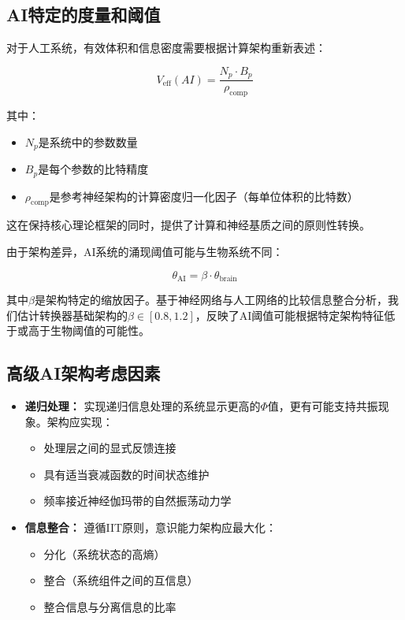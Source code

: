 \documentclass[12pt]{article}
\begin{document}
\begin{CJK}{UTF8}{gbsn}
\subsection{AI特定的度量和阈值}

对于人工系统，有效体积和信息密度需要根据计算架构重新表述：

\begin{equation}
V_{\text{eff}}(AI) = \frac{N_p \cdot B_p}{\rho_{\text{comp}}}
\end{equation}

其中：
\begin{itemize}
    \item $N_p$是系统中的参数数量
    \item $B_p$是每个参数的比特精度
    \item $\rho_{\text{comp}}$是参考神经架构的计算密度归一化因子（每单位体积的比特数）
\end{itemize}

这在保持核心理论框架的同时，提供了计算和神经基质之间的原则性转换。

由于架构差异，AI系统的涌现阈值可能与生物系统不同：

\begin{equation}
\theta_{\text{AI}} = \beta \cdot \theta_{\text{brain}}
\end{equation}

其中$\beta$是架构特定的缩放因子。基于神经网络与人工网络的比较信息整合分析\cite{tononi2016,oizumi2014}，我们估计转换器基础架构的$\beta \in [0.8, 1.2]$，反映了AI阈值可能根据特定架构特征低于或高于生物阈值的可能性。

\subsection{高级AI架构考虑因素}
\begin{itemize}
    \item \textbf{递归处理：} 实现递归信息处理的系统显示更高的$\Phi$值，更有可能支持共振现象\cite{oizumi2014,tegmark2016}。架构应实现：
    \begin{itemize}[label=--]
        \item 处理层之间的显式反馈连接
        \item 具有适当衰减函数的时间状态维护
        \item 频率接近神经伽玛带的自然振荡动力学
    \end{itemize}
    
    \item \textbf{信息整合：} 遵循IIT原则，意识能力架构应最大化：
    \begin{itemize}[label=--]
        \item 分化（系统状态的高熵）
        \item 整合（系统组件之间的互信息）
        \item 整合信息与分离信息的比率
    \end{itemize}
    

\end{itemize}
\end{CJK}
\end{document}
